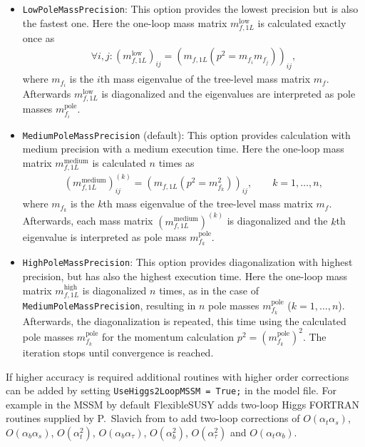 \documentclass[final,3p,11pt,pdflatex]{elsarticle}
\makeatletter
\newcommand{\fs}{FlexibleSUSY\@\xspace}
\newcommand{\code}[1]{\lstinline|#1|}  %
\newcommand{\pole}{\text{pole}}
\def\at{\alpha_t}
\def\ab{\alpha_b}
\def\as{\alpha_s}
\def\atau{\alpha_{\tau}}
\def\oatab{O(\at\ab)}
\def\oatas{O(\at\as)}
\def\oabas{O(\ab\as)}
\def\oatq{O(\at^2)}
\def\oabq{O(\ab^2)}
\def\oatauq{O(\atau^2)}
\def\oabatau{O(\ab \atau)}
\makeatother
\begin{document}
\begin{itemize}
\item \code{LowPoleMassPrecision}: This option provides the
  lowest precision but is also the fastest one.  Here the one-loop
  mass matrix $m_{f,1L}^\text{low}$ is calculated exactly once as
%
  \begin{align}
    \forall i,j: (m_{f,1L}^\text{low})_{ij} = (m_{f,1L}(p^2 = m_{f_i}
    m_{f_j}))_{ij} ,
  \end{align}
%
  where $m_{f_i}$ is the $i$th mass eigenvalue of the tree-level mass
  matrix $m_f$.  Afterwards $m_{f,1L}^\text{low}$ is diagonalized and
  the eigenvalues are interpreted as pole masses $m_{f_i}^\pole$.

\item \code{MediumPoleMassPrecision} (default): This option
  provides calculation with medium precision with a medium execution
  time.  Here the one-loop mass matrix $m_{f,1L}^\text{medium}$ is
  calculated $n$ times as
%
  \begin{align}
    (m_{f,1L}^\text{medium})_{ij}^{(k)} = (m_{f,1L}(p^2 =
    m_{f_k}^2))_{ij} , \qquad k = 1,\ldots,n ,
  \end{align}
%
  where $m_{f_k}$ is the $k$th mass eigenvalue of the tree-level mass
  matrix $m_f$.  Afterwards, each mass matrix
  $(m_{f,1L}^\text{medium})^{(k)}$ is diagonalized and the $k$th
  eigenvalue is interpreted as pole mass $m_{f_k}^\pole$.

\item \code{HighPoleMassPrecision}: This option provides
  diagonalization with highest precision, but has also the highest
  execution time.  Here the one-loop mass matrix
  $m_{f,1L}^\text{high}$ is diagonalized $n$ times, as in the case of
  \code{MediumPoleMassPrecision}, resulting in $n$ pole masses
  $m_{f_k}^\pole$ ($k = 1,\ldots,n$).  Afterwards, the diagonalization
  is repeated, this time using the calculated pole masses
  $m_{f_k}^\pole$ for the momentum calculation $p^2 =
  (m_{f_k}^\pole)^2$.  The iteration stops until convergence is
  reached.
\end{itemize}

If higher accuracy is required additional routines with higher order
corrections can be added by setting \code{UseHiggs2LoopMSSM = True;}
in the model file. For example in the MSSM by default \fs adds
two-loop Higgs FORTRAN routines supplied by P.~Slavich from
\cite{Degrassi:2001yf,Brignole:2001jy,Dedes:2002dy,Brignole:2002bz,Dedes:2003km}
to add two-loop corrections of $\oatas$, $\oabas$, $\oatq$,
$\oabatau$, $\oabq$, $\oatauq$ and $\oatab$.
\end{document}
